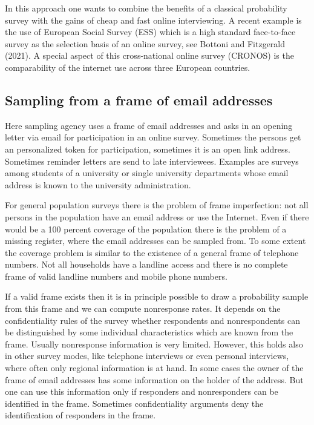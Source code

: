 \documentclass[a4paper , 11pt]{article}
\begin{document}
In this approach one wants to combine the benefits of a classical probability survey with the gains of cheap and fast online interviewing. A recent example is the use of European Social Survey (ESS) which is a high standard face-to-face survey as the selection basis of an online survey, see Bottoni and Fitzgerald (2021). A special aspect of this cross-national online survey (CRONOS) is the comparability of the internet use across three European countries.  

\subsection{Sampling from a frame of email addresses}

Here sampling agency uses a frame of email addresses and asks in an opening letter via email for participation in an online survey. Sometimes the persons get an personalized token for participation, sometimes it is an open link address. Sometimes reminder letters are send to late interviewees. Examples are  surveys among students of a university or single university departments whose email address is known to the university administration.

For general population surveys there is the problem of frame imperfection: not all persons in the population have an email address or use the Internet. Even if there would be a 100 percent coverage of the population there is the problem of a missing register, where the email addresses can be sampled from. To some extent the coverage problem is similar to the existence of a general frame of telephone numbers. Not all households have a landline access and there is no complete frame of valid landline numbers and mobile phone numbers.

If a valid frame exists then it is in principle possible to draw a probability sample from this frame and we can compute nonresponse rates. It depends on the confidentiality rules of the survey whether respondents and nonrespondents can be distinguished by some individual characteristics which are known from the frame. Usually nonresponse information is very limited. However, this holds also in other survey modes, like telephone interviews or even personal interviews, where often only regional information is at hand. In some cases the owner of the frame of email addresses has some information on the holder of the address. But one can use this information only if responders and nonresponders can be identified in the frame. Sometimes confidentiality arguments deny the identification of responders in the frame.
\end{document}
